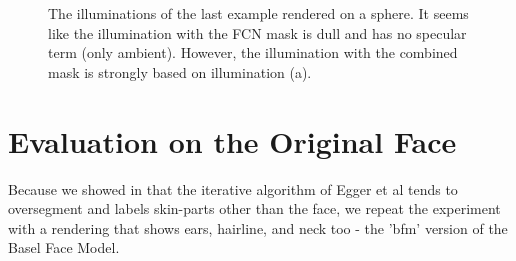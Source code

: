 \begin{figure}
	\centering
	
	\caption{The illuminations of the last example rendered on a sphere. It seems like the illumination with the FCN mask is dull and has no specular term (only ambient). However, the illumination with the combined mask is strongly based on illumination (a).}
	\label{fig:chap4:bsp1_illumination}
\end{figure}
  
\section{Evaluation on the Original Face}
Because we showed in  that the iterative algorithm of Egger et al tends to oversegment and labels skin-parts other than the face, we repeat the experiment with a rendering that shows ears, hairline, and neck too - the 'bfm' version of the Basel Face Model.

